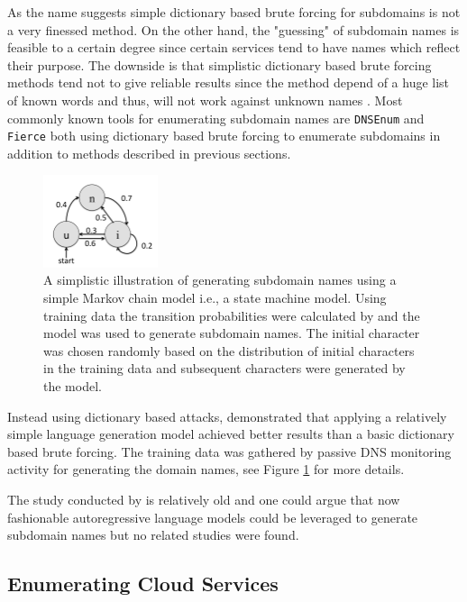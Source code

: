 As the name suggests simple dictionary based brute forcing for subdomains is not a very finessed method. On the other hand, the "guessing" of subdomain names is feasible to a certain degree since certain services tend to have names which reflect their purpose. The downside is that simplistic dictionary based brute forcing methods tend not to give reliable results since the method depend of a huge list of known words and
thus, will not work against unknown names \cite{SMART_BRUTE}. Most commonly known tools for enumerating subdomain names are \texttt{DNSEnum} \cite{dnsenum} and \texttt{Fierce} \cite{fierce} both using dictionary based brute forcing to enumerate subdomains in addition to methods described in previous sections.

\begin{figure}[h]
  \begin{center}
    \includegraphics[width=0.3\textwidth]{markov.png}
    \caption{A simplistic illustration of generating subdomain names using a simple Markov chain model i.e., a state machine model. Using training data the transition probabilities were calculated by \citet{SMART_BRUTE} and the model was used to generate subdomain names. The initial character was chosen randomly based on the distribution of initial characters in the training data and subsequent characters were generated by the model.} 
    \label{fig:markov}
  \end{center}
\end{figure}

Instead using dictionary based attacks, \citet{SMART_BRUTE} demonstrated that applying a relatively simple language generation model achieved better results than a basic dictionary based brute forcing. The training data was gathered by passive DNS monitoring activity for generating the domain names, see Figure \ref{fig:markov} for more details.


The study conducted by \citet{SMART_BRUTE} is relatively old and one could argue that now fashionable autoregressive language models could be leveraged to generate subdomain names but no related studies were found.


\subsection{Enumerating Cloud Services}
\label{sec:cloud}


